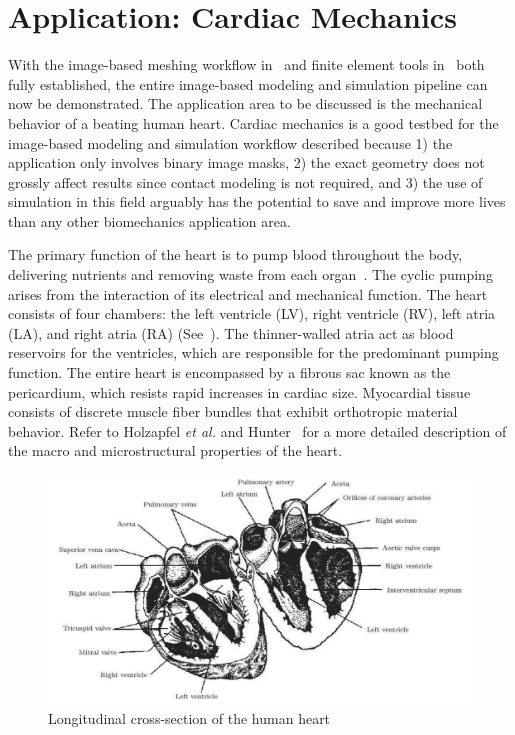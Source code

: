\chapter{Application: Cardiac Mechanics}
\label{chap:5}
%
With the image-based meshing workflow in~ and finite element tools in~ both fully established, the entire image-based modeling and simulation pipeline can now be demonstrated. The application area to be discussed is the mechanical behavior of a beating human heart. Cardiac mechanics is a good testbed for the image-based modeling and simulation workflow described because 1) the application only involves binary image masks, 2) the exact geometry does not grossly affect results since contact modeling is not required, and 3) the use of simulation in this field arguably has the potential to save and improve more lives than any other biomechanics application area.

The primary function of the heart is to pump blood throughout the body, delivering nutrients and removing waste from each organ~\cite{holzapfel_2009}. The cyclic pumping arises from the interaction of its electrical and mechanical function. The heart consists of four chambers: the left ventricle (LV), right ventricle (RV), left atria (LA), and right atria (RA) (See~). The thinner-walled atria act as blood reservoirs for the ventricles, which are responsible for the predominant pumping function. The entire heart is encompassed by a fibrous sac known as the pericardium, which resists rapid increases in cardiac size. Myocardial tissue consists of discrete muscle fiber bundles that exhibit orthotropic material behavior. Refer to Holzapfel \textit{et al.} and Hunter~\cite{holzapfel_2009} for a more detailed description of the macro and microstructural properties of the heart.

\begin{figure}[htbp!]
\centering
\includegraphics[width=1.0\textwidth]{media/anatomy.png}
\caption{Longitudinal cross-section of the human heart~\cite{katz_2015}}
\label{fig:anatomy}
\end{figure}

